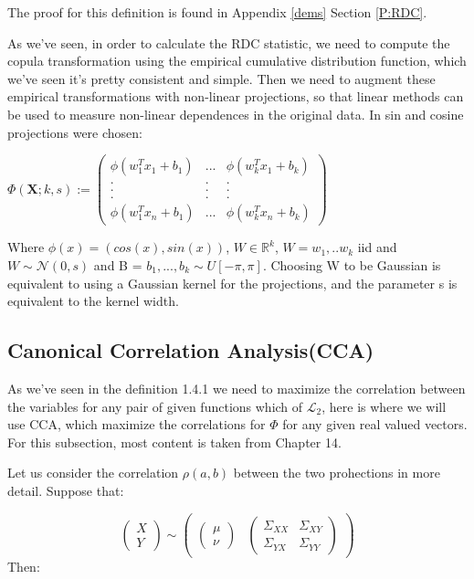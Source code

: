 The proof for this definition is found in Appendix \ref{dems} Section \ref{P:RDC}. 

As we've seen, in order to calculate the RDC statistic, we need to compute the copula transformation using the empirical cumulative distribution function, which we've seen it's pretty consistent and simple. Then we need to augment these empirical transformations with non-linear projections, so that linear methods can be used to measure non-linear dependences in the original data.
In \cite{RDC1} sin and cosine projections were chosen:

$\Phi(\textbf{X};k,s):=
\left(\begin{array}{ccc} \phi(w_{1}^{T}x_{1} + b_{1})	&	...	&	\phi(w_{k}^{T}x_{1} + b_{k}) \\
. & . & . \\
. & . & . \\
. & . & .\\
\phi(w_{1}^{T}x_{n} + b_{1}) & ... & \phi(w_{k}^{T}x_{n} + b_{k}) \end{array}\right)$

Where $\phi(x) = (cos(x),sin(x))$, $W\in\mathbb{R}^{k}$, $W =w_{1},..w_{k}$ iid and $W\sim\mathcal{N}(0,s)$ and B = $b_{1},...,b_{k} \sim U[-\pi,\pi]$. 
Choosing W to be Gaussian is equivalent to using a Gaussian kernel for the projections, and the parameter s is equivalent to the kernel width.


\subsection{Canonical Correlation Analysis(CCA)}
As we've seen in the definition 1.4.1 we need to maximize the correlation between the variables for any pair of given functions which of $\mathcal{L}_{2}$, here is where we will use CCA, which maximize the correlations for $\Phi$ for any given real valued vectors. For this subsection, most content is taken from \cite{CCA} Chapter 14.

Let us consider the correlation $\rho(a,b)$ between the two prohections in more detail. Suppose that:

$$
\left(\begin{array}{cc} X \\ Y \end{array}\right) \sim
\left(\begin{array}{cc} \left(\begin{array}{cc} \mu \\ \nu\end{array}\right) & \left(\begin{array}{cc} \Sigma_{XX} & \Sigma_{XY} \\
\Sigma_{YX} & \Sigma_{YY}\end{array}\right)\end{array}\right)
$$
Then:

